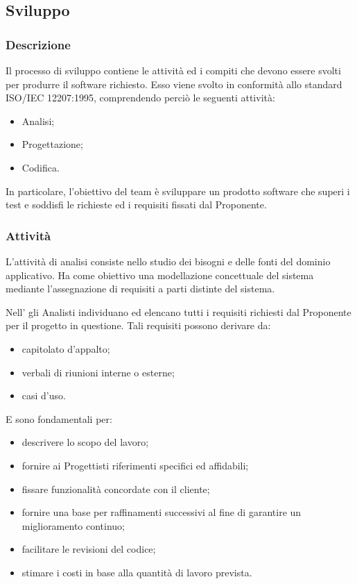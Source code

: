 \subsection{Sviluppo}
	\subsubsection{Descrizione}
	Il processo di sviluppo contiene le attività ed i compiti che devono essere svolti per produrre il software richiesto. Esso viene svolto in conformità allo standard ISO/IEC 12207:1995, comprendendo perciò le seguenti attività:
	\begin{itemize}
		\item{Analisi;}
		\item{Progettazione;}
		\item{Codifica.}
	\end{itemize}

	In particolare, l'obiettivo del team è sviluppare un prodotto software che superi i test e soddisfi le richieste ed i requisiti fissati dal Proponente.

    \subsubsection{Attività}
	L'attività di analisi consiste nello studio dei bisogni e delle fonti del dominio applicativo. Ha come obiettivo una modellazione concettuale del sistema mediante l'assegnazione di requisiti a parti distinte del sistema.

          	Nell'\AdR{} gli Analisti individuano ed elencano tutti i requisiti richiesti dal Proponente per il progetto in questione. Tali requisiti possono derivare da:
     \begin{itemize}
           		\item{capitolato d'appalto;}
				\item{verbali di riunioni interne o esterne;}
				\item{casi d'uso.}
    	\end{itemize}

          	E sono fondamentali per:
        \begin{itemize}
       		\item{descrivere lo scopo del lavoro;}
			\item{fornire ai Progettisti riferimenti specifici ed affidabili;}
			\item{fissare funzionalità concordate con il cliente;}
			\item{fornire una base per raffinamenti successivi al fine di garantire un miglioramento continuo;}
			\item{facilitare le revisioni del codice;}
			\item{stimare i costi in base alla quantità di lavoro prevista.}
       	\end{itemize}

